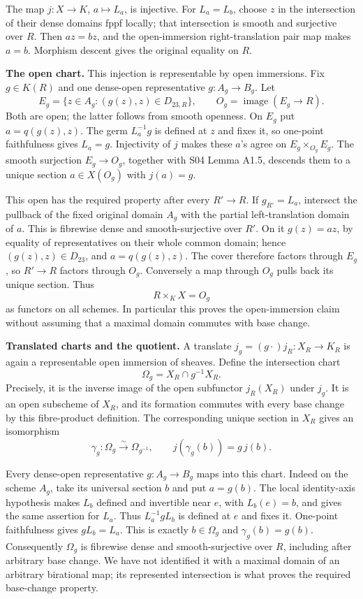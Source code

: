 \documentclass[11pt,a4paper,openany]{report}
\begin{document}
The map \(j:X\to K\), \(a\mapsto L_a\), is injective. For \(L_a=L_b\), choose \(z\) in the intersection of their dense domains fppf locally; that intersection is smooth and surjective over \(R\). Then \(az=bz\), and the open-immersion right-translation pair map makes \(a=b\). Morphism descent gives the original equality on \(R\).

\textbf{The open chart.} This injection is representable by open immersions. Fix \(g\in K(R)\) and one dense-open representative \(g:A_g\to B_g\). Let \[
E_g=\{z\in A_g:(g(z),z)\in D_{23,R}\},\qquad
O_g=\operatorname{image}(E_g\to R).
\] Both are open; the latter follows from smooth openness. On \(E_g\) put \(a=q(g(z),z)\). The germ \(L_a^{-1}g\) is defined at \(z\) and fixes it, so one-point faithfulness gives \(L_a=g\). Injectivity of \(j\) makes these \(a\)'s agree on \(E_g\times_{O_g}E_g\). The smooth surjection \(E_g\to O_g\), together with S04 Lemma A1.5, descends them to a unique section \(a\in X(O_g)\) with \(j(a)=g\).

This open has the required property after every \(R'\to R\). If \(g_{R'}=L_a\), intersect the pullback of the fixed original domain \(A_g\) with the partial left-translation domain of \(a\). This is fibrewise dense and smooth-surjective over \(R'\). On it \(g(z)=az\), by equality of representatives on their whole common domain; hence \((g(z),z)\in D_{23}\), and \(a=q(g(z),z)\). The cover therefore factors through \(E_g\), so \(R'\to R\) factors through \(O_g\). Conversely a map through \(O_g\) pulls back its unique section. Thus \[
R\times_KX=O_g
\] as functors on all schemes. In particular this proves the open-immersion claim without assuming that a maximal domain commutes with base change.

\textbf{Translated charts and the quotient.} A translate \(j_g=(g\cdot)j_R:X_R\to K_R\) is again a representable open immersion of sheaves. Define the intersection chart \[
\Omega_g=X_R\cap g^{-1}X_R.
\] Precisely, it is the inverse image of the open subfunctor \(j_R(X_R)\) under \(j_g\). It is an open subscheme of \(X_R\), and its formation commutes with every base change by this fibre-product definition. The corresponding unique section in \(X_R\) gives an isomorphism \[
\gamma_g:\Omega_g\xrightarrow{\sim}\Omega_{g^{-1}},\qquad
j(\gamma_g(b))=g\,j(b).
\]

Every dense-open representative \(g:A_g\to B_g\) maps into this chart. Indeed on the scheme \(A_g\), take its universal section \(b\) and put \(a=g(b)\). The local identity-axis hypothesis makes \(L_b\) defined and invertible near \(e\), with \(L_b(e)=b\), and gives the same assertion for \(L_a\). Thus \(L_a^{-1}gL_b\) is defined at \(e\) and fixes it. One-point faithfulness gives \(gL_b=L_a\). This is exactly \(b\in\Omega_g\) and \(\gamma_g(b)=g(b)\). Consequently \(\Omega_g\) is fibrewise dense and smooth-surjective over \(R\), including after arbitrary base change. We have not identified it with a maximal domain of an arbitrary birational map; its represented intersection is what proves the required base-change property.
\end{document}
